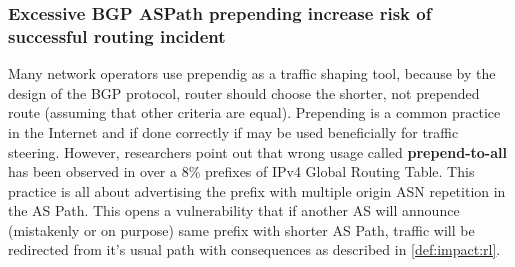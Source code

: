 \subsubsection{Excessive BGP ASPath prepending increase risk of successful routing incident}
Many network operators use prependig as a traffic shaping tool, because by the design of the BGP protocol, router should choose the shorter, not prepended route (assuming that other criteria are equal). Prepending is a common practice in the Internet and if done correctly if may be used beneficially for traffic steering. However, researchers point out\cite{Madory2019} that wrong usage called \textbf{prepend-to-all} has been observed in over a 8\% prefixes of IPv4 Global Routing Table. This practice is all about advertising the prefix with multiple origin ASN repetition in the AS Path. This opens a vulnerability that if another AS will announce (mistakenly or on purpose) same prefix with shorter AS Path, traffic will be redirected from it's usual path with consequences as described in \ref{def:impact:rl}. 
